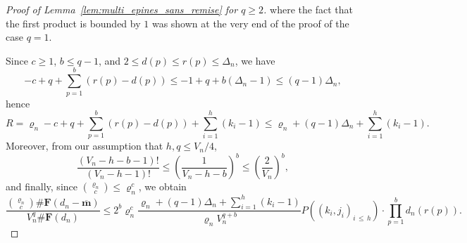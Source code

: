 \documentclass[10pt]{amsart}
\theoremstyle{definition}\newtheorem{defi}[theo]{Definition}\newtheorem{rema}[theo]{Remark}\newtheorem{exam}[theo]{Example}\newtheorem{exem}[theo]{Example}\newtheorem{nota}[theo]{Notation}
\newcommand{\ensembles}[1]{\mathbf{#1}}
\newcommand{\1}{\ensembles{1}}
\newcommand{\m}{\mathbf{m}}
\renewcommand{\le}{\leqslant}
\renewcommand{\ge}{\geqslant}
\newcommand{\vertices}{V}
\providecommand{\?}{}
\begin{document}
\begin{proof}[Proof of Lemma~\ref{lem:multi_epines_sans_remise} for $q \ge 2$]
where the fact that the first product is bounded by $1$ was shown at the very end of the proof of the case $q=1$.

Since $c \ge 1$, $b \le q-1$, and $2 \le d(p) \le r(p) \le \Delta_n$, we have
\[
- c + q + \sum_{p=1}^b \left(r(p) - d(p)\right)
\le - 1 + q + b \left(\Delta_n-1\right)
\le (q-1) \Delta_n,
\]
hence
\[
R = \varrho_n - c + q + \sum_{p=1}^b \left(r(p) - d(p)\right) + \sum_{i=1}^h \left(k_i - 1\right)
\le \varrho_n + (q-1) \Delta_n + \sum_{i=1}^h \left(k_i - 1\right).
\]
Moreover, from our assumption that $h, q \le \vertices_n/4$,
\[
\frac{(\vertices_n-h-b-1)!}{(\vertices_n - h - 1)!}
\le \left(\frac{1}{\vertices_n - h - b}\right)^b
\le \left(\frac{2}{\vertices_n}\right)^b,
\]
and finally, since $\binom{\varrho_n}{c} \le \varrho_n^c$, we obtain
\[
\frac{\binom{\varrho_n}{c} \#\ensembles{F}\left(d_n - \overline{\m}\right)}{\vertices_n^q \#\ensembles{F}(d_n)}
\le 2^b \varrho_n^c \frac{\varrho_n + (q-1) \Delta_n + \sum_{i=1}^h (k_i - 1)}{\varrho_n \vertices_n^{q+b}} P\left(\left(k_i, j_i\right)_{i\,\le\,h}\right)
\cdot \prod_{p=1}^b d_n(r(p)).
\]



\end{proof}
\end{document}
